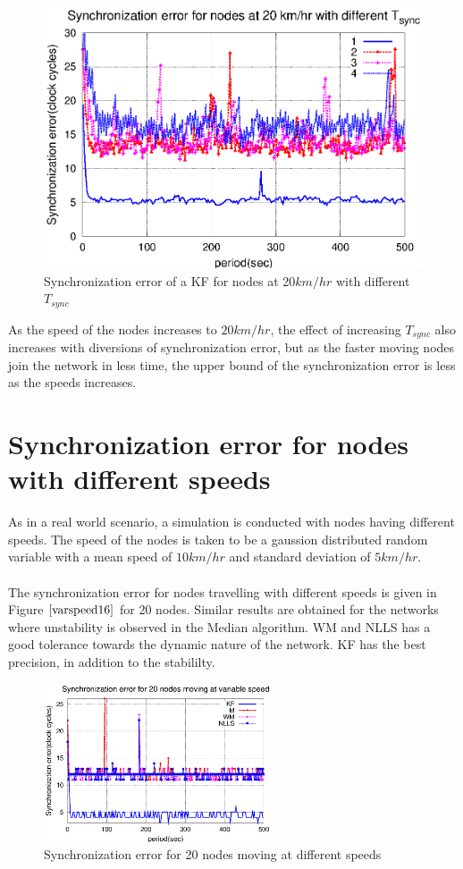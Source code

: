 \documentclass[a4paper,10pt]{report}
\begin{document}
\begin{figure}[!h]
\centering
\includegraphics[width= 0.7 \textwidth]{tsync20}
\caption{Synchronization error of a KF for nodes at 20$km/hr$ with different $T_{sync}$} \label{tsync20}
\end{figure}
As the speed of the nodes increases to $20km/hr$, the effect of increasing $T_{sync}$ also increases with diversions of synchronization error, but as the faster moving nodes join the network in less time, the upper bound of the synchronization error is less as the speeds increases. 
\section{\textbf{Synchronization error for nodes with different speeds}}
As in a real world scenario, a simulation is conducted with nodes having different speeds. The speed of the nodes is taken to be a gaussion distributed random variable with a mean speed of $10km/hr$ and standard deviation of $5km/hr$.
\paragraph*{}
The synchronization error for nodes travelling with different speeds is given in Figure $\ref{varspeed16}$ for 20 nodes. Similar results are obtained for the networks where unstability is observed in the Median algorithm. WM and NLLS has a good tolerance towards the dynamic nature of the network. KF has the best precision, in addition to the stabililty.
\begin{figure}
 \centering
 \includegraphics[width=0.6\textwidth]{varspeed20}
 \caption{Synchronization error for 20 nodes moving at different speeds}
 \label{varspeed16}
\end{figure}
\end{document}
